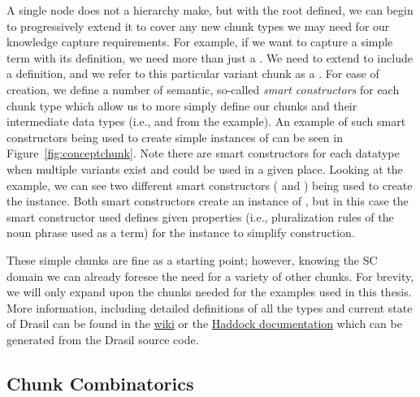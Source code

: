 
A single node does not a hierarchy make, but with the root  
defined, we can begin to progressively extend it to cover any new chunk types 
we may need for our knowledge capture requirements. For example, if we want to 
capture a simple term with its definition, we need more than just a 
. We need to extend  to include a 
definition, and we refer to this particular variant chunk as a 
. For ease of creation, we define a number of semantic, 
so-called \emph{smart constructors} for each chunk type which allow us to more 
simply define our chunks and their intermediate data types (i.e.,  and
 from the  example). An example of such smart 
constructors being used to create simple instances of  can 
be seen in Figure~\ref{fig:conceptchunk}. Note there are smart constructors 
for each datatype when multiple variants exist and could be used in a given 
place. Looking at the  example, we can see two different 
smart constructors ( and ) being used to create the 
 instance. Both smart constructors create an instance of , 
but in this case the smart constructor used defines given properties (i.e.,
pluralization rules of the noun phrase used as a term) for the instance to 
simplify construction.


These simple chunks are fine as a starting point; however, knowing the SC 
domain we can already foresee the need for a variety of other chunks. For 
brevity, we will only expand upon the chunks needed for the examples used in 
this thesis. More information, including detailed definitions of all the types 
and current state of Drasil can be found in the 
\href{https://github.com/JacquesCarette/Drasil/wiki/}
{wiki} or the \href{https://jacquescarette.github.io/Drasil/docs/full/}
{Haddock documentation} which can be generated from the Drasil source code.

\subsection{Chunk Combinatorics}
\label{sec:chunky}

